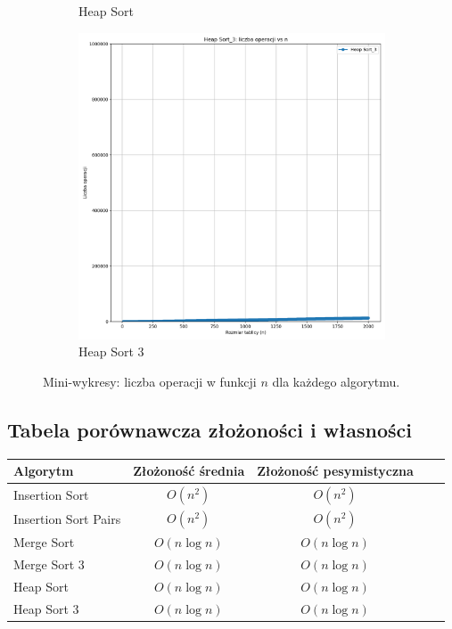 \documentclass[11pt,a4paper]{article}
\begin{document}
\begin{figure}[h]
\begin{subfigure}{.32\textwidth}
    \caption{Heap Sort}
  \end{subfigure}
  \begin{subfigure}{.32\textwidth}
    \centering\includegraphics[width=\linewidth]{heap_sort_3.png}
    \caption{Heap Sort 3}
  \end{subfigure}
  \caption{Mini-wykresy: liczba operacji w funkcji $n$ dla każdego algorytmu.}
\end{figure}

\subsection{Tabela porównawcza złożoności i własności}
\begin{center}
\begin{tabular}{@{}lcccc@{}}
\toprule
Algorytm & Złożoność średnia & Złożoność pesymistyczna \\
\midrule
Insertion Sort & $O(n^2)$ & $O(n^2)$ \\
Insertion Sort Pairs & $O(n^2)$ & $O(n^2)$ \\
Merge Sort & $O(n\log n)$ & $O(n\log n)$  \\
Merge Sort 3 & $O(n\log n)$ & $O(n\log n)$  \\
Heap Sort & $O(n\log n)$ & $O(n\log n)$  \\
Heap Sort 3 & $O(n\log n)$ & $O(n\log n)$  \\
\bottomrule
\end{tabular}
\end{center}
\end{document}
